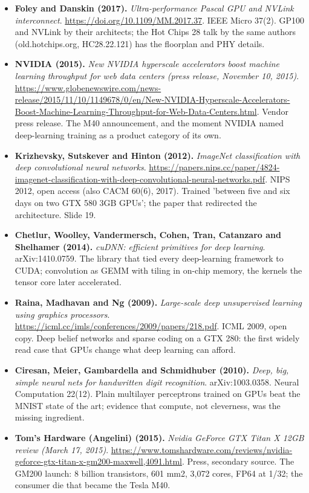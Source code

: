 \documentclass[11pt,letterpaper]{article}
\begin{document}
\begin{itemize}[leftmargin=1.2em,itemsep=3pt]
\item \textbf{Foley and Danskin (2017).} \textit{Ultra-performance Pascal GPU and NVLink interconnect}. \url{https://doi.org/10.1109/MM.2017.37}. IEEE Micro 37(2). GP100 and NVLink by their architects; the Hot Chips 28 talk by the same authors (old.hotchips.org, HC28.22.121) has the floorplan and PHY details.
\item \textbf{NVIDIA (2015).} \textit{New NVIDIA hyperscale accelerators boost machine learning throughput for web data centers (press release, November 10, 2015)}. \url{https://www.globenewswire.com/news-release/2015/11/10/1149678/0/en/New-NVIDIA-Hyperscale-Accelerators-Boost-Machine-Learning-Throughput-for-Web-Data-Centers.html}. Vendor press release. The M40 announcement, and the moment NVIDIA named deep-learning training as a product category of its own.
\item \textbf{Krizhevsky, Sutskever and Hinton (2012).} \textit{ImageNet classification with deep convolutional neural networks}. \url{https://papers.nips.cc/paper/4824-imagenet-classification-with-deep-convolutional-neural-networks.pdf}. NIPS 2012, open access (also CACM 60(6), 2017). Trained 'between five and six days on two GTX 580 3GB GPUs'; the paper that redirected the architecture. Slide 19.
\item \textbf{Chetlur, Woolley, Vandermersch, Cohen, Tran, Catanzaro and Shelhamer (2014).} \textit{cuDNN: efficient primitives for deep learning}. arXiv:1410.0759. The library that tied every deep-learning framework to CUDA; convolution as GEMM with tiling in on-chip memory, the kernels the tensor core later accelerated.
\item \textbf{Raina, Madhavan and Ng (2009).} \textit{Large-scale deep unsupervised learning using graphics processors}. \url{https://icml.cc/imls/conferences/2009/papers/218.pdf}. ICML 2009, open copy. Deep belief networks and sparse coding on a GTX 280: the first widely read case that GPUs change what deep learning can afford.
\item \textbf{Ciresan, Meier, Gambardella and Schmidhuber (2010).} \textit{Deep, big, simple neural nets for handwritten digit recognition}. arXiv:1003.0358. Neural Computation 22(12). Plain multilayer perceptrons trained on GPUs beat the MNIST state of the art; evidence that compute, not cleverness, was the missing ingredient.
\item \textbf{Tom's Hardware (Angelini) (2015).} \textit{Nvidia GeForce GTX Titan X 12GB review (March 17, 2015)}. \url{https://www.tomshardware.com/reviews/nvidia-geforce-gtx-titan-x-gm200-maxwell,4091.html}. Press, secondary source. The GM200 launch: 8 billion transistors, 601 mm2, 3,072 cores, FP64 at 1/32; the consumer die that became the Tesla M40.
\end{itemize}
\end{document}
